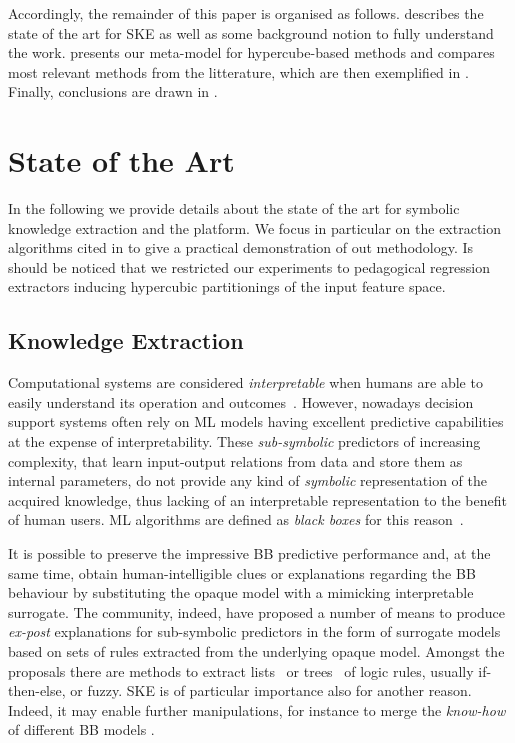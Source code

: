 \documentclass[
]{ceurart}
\begin{document}
Accordingly, the remainder of this paper is organised as follows.
%
 describes the state of the art for SKE as well as some background notion to fully understand the work.
%
 presents our meta-model for hypercube-based methods and compares most relevant methods from the litterature, which are then exemplified in .
%
Finally, conclusions are drawn in .

\section{State of the Art}\label{sec:state}

In the following we provide details about the state of the art for symbolic knowledge extraction and the \psyke{} platform.
%
We focus in particular on the extraction algorithms cited in  to give a practical demonstration of out methodology.
%
Is should be noticed that we restricted our experiments to pedagogical regression extractors inducing hypercubic partitionings of the input feature space.

\subsection{Knowledge Extraction}\label{ssec:extraction}

Computational systems are considered \emph{interpretable} when humans are able to easily understand its operation and outcomes~\cite{agentbasedxai-aamas2020}.
%
However, nowadays decision support systems often rely on ML models having excellent predictive capabilities at the expense of interpretability.
%
These \emph{sub-symbolic} predictors of increasing complexity, that learn input-output relations from data and store them as internal parameters, do not provide any kind of \emph{symbolic} representation of the acquired knowledge, thus lacking of an interpretable representation to the benefit of human users.
%
ML algorithms are defined as \emph{black boxes} for this reason~\cite{Lipton2018}.

It is possible to preserve the impressive BB predictive performance and, at the same time, obtain human-intelligible clues or explanations regarding the BB behaviour by substituting the opaque model with a mimicking interpretable surrogate.
%
The \xai{} community, indeed, have proposed a number of means to produce \emph{ex-post} explanations for sub-symbolic predictors in the form of surrogate models based on sets of rules extracted from the underlying opaque model.
%
Amongst the proposals there are methods to extract lists~\cite{craven1994using,huysmans2006iter,gridex-extraamas2021} or trees~\cite{craven1996extracting,breiman1984classification} of logic rules, usually if-then-else, \mofn{} or fuzzy.
%
SKE is of particular importance also for another reason.
%
Indeed, it may enable further manipulations, for instance to merge the \emph{know-how} of different BB models \cite{xmas-aiiot2019}.
\end{document}
